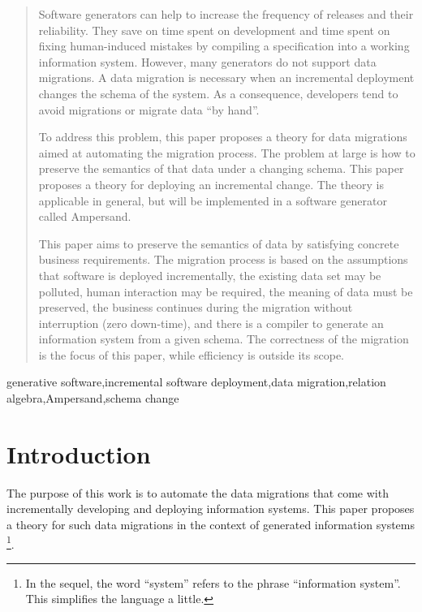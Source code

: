 \documentclass{elsarticle}
\begin{document}
\begin{abstract}
   Software generators can help to increase the frequency of releases and their reliability.
   They save on time spent on development and time spent on fixing human-induced mistakes by compiling a specification into a working information system.
   However, many generators do not support data migrations.
   A data migration is necessary when an incremental deployment changes the schema of the system.
   As a consequence, developers tend to avoid migrations or migrate data ``by hand''.

   To address this problem, this paper proposes a theory for data migrations aimed at automating the migration process.
   The problem at large is how to preserve the semantics of that data under a changing schema.
   This paper proposes a theory for deploying an incremental change.
   The theory is applicable in general, but will be implemented in a software generator called Ampersand.

   This paper aims to preserve the semantics of data by satisfying concrete business requirements.
   The migration process is based on the assumptions that
   software is deployed incrementally,
   the existing data set may be polluted,
   human interaction may be required,
   the meaning of data must be preserved,
   the business continues during the migration without interruption (zero down-time),
   and there is a compiler to generate an information system from a given schema.
   The correctness of the migration is the focus of this paper, while efficiency is outside its scope.
\end{abstract}

\begin{keyword}
generative software\sep incremental software deployment\sep data migration\sep relation algebra\sep Ampersand\sep schema change
\end{keyword}
\maketitle

\section{Introduction}
\label{sct:Introduction}
   The purpose of this work is to automate the data migrations that come with incrementally developing and deploying information systems.
   This paper proposes a theory for such data migrations in the context of generated information systems%
\footnote{In the sequel, the word ``system'' refers to the phrase ``information system''. This simplifies the language a little. }.
\end{document}
